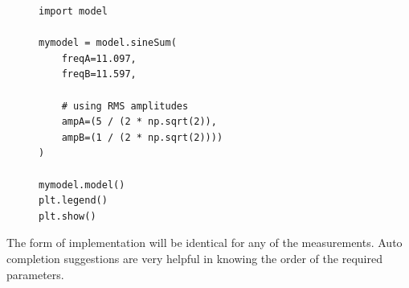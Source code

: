 \documentclass{article}
\begin{document}
\begin{figure}[H]
\centering
\begin{minipage}{1\textwidth}
\begin{tcolorbox}
\begin{verbatim}
import model

mymodel = model.sineSum(
    freqA=11.097, 
    freqB=11.597, 

    # using RMS amplitudes
    ampA=(5 / (2 * np.sqrt(2)), 
    ampB=(1 / (2 * np.sqrt(2))))
)

mymodel.model()
plt.legend()
plt.show()
\end{verbatim}
\end{tcolorbox}
\end{minipage}
\end{figure}

The form of implementation will be identical for any of the measurements.
Auto completion suggestions are very helpful in knowing the order of the
required parameters.
\end{document}
